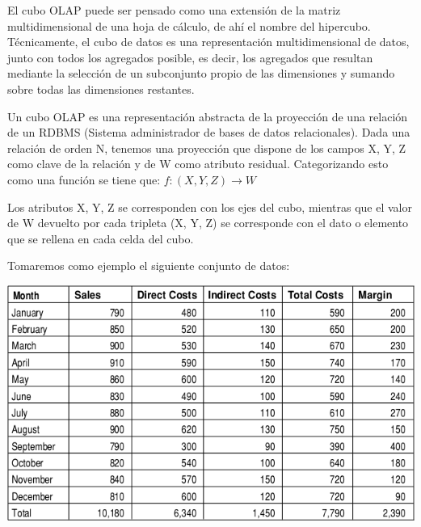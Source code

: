 \documentclass{fancyslides}
\begin{document}
\begin{frame}
\end{frame}

\begin{frame}
\misc
{
El cubo OLAP puede ser pensado como una extensión de la matriz multidimensional de una hoja de cálculo, de ahí el nombre del hipercubo. Técnicamente, el cubo de datos es una representación multidimensional de datos, junto con todos los agregados posible, es decir, los agregados que resultan mediante la selección de un subconjunto propio de las dimensiones y sumando sobre todas las dimensiones restantes.
}
\end{frame}

\begin{frame}
\misc
{
Un cubo OLAP es una representación abstracta de la proyección de una relación de un RDBMS (Sistema administrador de bases de datos relacionales).
Dada una relación de orden N, tenemos una proyección que dispone de los campos X, Y, Z como clave de la relación y de W como atributo residual.
Categorizando esto como una función se tiene que:
$f : (X,Y,Z) \rightarrow  W$

Los atributos X, Y, Z se corresponden con los ejes del cubo, mientras que el valor de W devuelto por cada tripleta (X, Y, Z) se corresponde con el dato o elemento que se rellena en cada celda del cubo.

}
\end{frame}

\begin{frame}
\misc
{
Tomaremos como ejemplo el siguiente conjunto de datos:
\begin{center}
\includegraphics[scale=0.4]{cube_1}
\end{center}
}
\end{frame}
\end{document}
